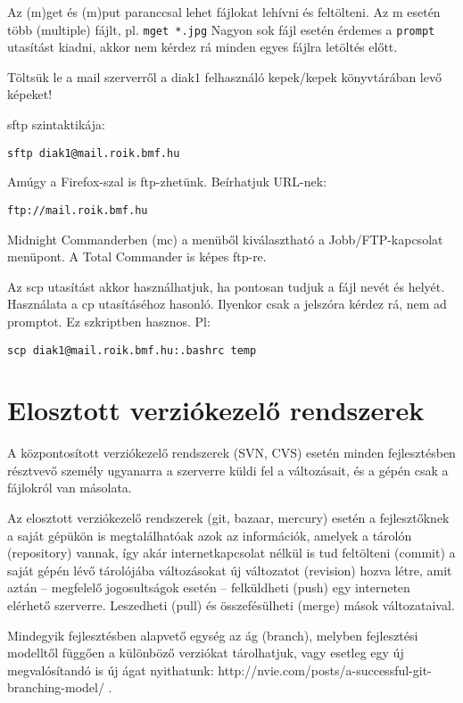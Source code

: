 \documentclass[a4paper]{article}
\newcommand{\code}{\texttt}
\begin{document}
Az (m)get és (m)put paranccsal lehet fájlokat lehívni és feltölteni. Az
m esetén több (multiple) fájlt, pl.  \code{mget *.jpg} Nagyon sok fájl
esetén érdemes a \code{prompt} utasítást kiadni, akkor nem kérdez rá
minden egyes fájlra letöltés előtt.

Töltsük le a mail szerverről a diak1 felhasználó kepek/kepek
könyvtárában levő képeket!

sftp szintaktikája:
\begin{Verbatim}
sftp diak1@mail.roik.bmf.hu
\end{Verbatim}

Amúgy a Firefox-szal is ftp-zhetünk. Beírhatjuk URL-nek:
\begin{Verbatim}
ftp://mail.roik.bmf.hu
\end{Verbatim}

Midnight Commanderben (mc) a menüből kiválasztható a Jobb/FTP-kapcsolat
menüpont. A Total Commander is képes ftp-re.

Az scp utasítást akkor használhatjuk, ha pontosan tudjuk a fájl nevét és
helyét.
Használata a cp utasításéhoz hasonló.  Ilyenkor csak a jelszóra kérdez
rá, nem ad promptot. Ez szkriptben hasznos. Pl:
\begin{Verbatim}
scp diak1@mail.roik.bmf.hu:.bashrc temp
\end{Verbatim}

\section{Elosztott verziókezelő rendszerek}

A központosított verziókezelő rendszerek (SVN, CVS) esetén minden
fejlesztésben résztvevő személy ugyanarra a szerverre küldi fel a
változásait, és a gépén csak a fájlokról van másolata.

Az elosztott verziókezelő rendszerek (git, bazaar, mercury) esetén a
fejlesztőknek a saját gépükön is megtalálhatóak azok az információk,
amelyek a tárolón (repository) vannak, így akár internetkapcsolat nélkül
is tud feltölteni (commit) a saját gépén lévő tárolójába változásokat új
változatot (revision) hozva létre, amit aztán -- megfelelő jogosultságok
esetén -- felküldheti (push) egy interneten elérhető szerverre.
Leszedheti (pull) és összefésülheti (merge) mások változataival.

Mindegyik fejlesztésben alapvető egység az ág (branch), melyben
fejlesztési modelltől függően a különböző verziókat tárolhatjuk, vagy
esetleg egy új megvalósítandó  is új ágat nyithatunk:
http://nvie.com/posts/a-successful-git-branching-model/ .
\end{document}
